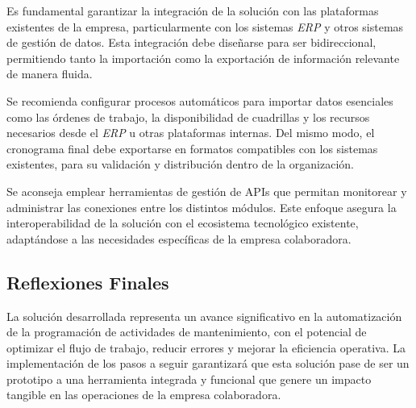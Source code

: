 \documentclass{article}
\begin{document}
Es fundamental garantizar la integración de la solución con las plataformas existentes de la empresa, particularmente con los sistemas \textit{ERP} y otros sistemas de gestión de datos. Esta integración debe diseñarse para ser bidireccional, permitiendo tanto la importación como la exportación de información relevante de manera fluida.

Se recomienda configurar procesos automáticos para importar datos esenciales como las órdenes de trabajo, la disponibilidad de cuadrillas y los recursos necesarios desde el \textit{ERP} u otras plataformas internas. Del mismo modo, el cronograma final debe exportarse en formatos compatibles con los sistemas existentes, para su validación y distribución dentro de la organización.

Se aconseja emplear herramientas de gestión de APIs que permitan monitorear y administrar las conexiones entre los distintos módulos. Este enfoque asegura la interoperabilidad de la solución con el ecosistema tecnológico existente, adaptándose a las necesidades específicas de la empresa colaboradora.


\subsection{Reflexiones Finales}  

La solución desarrollada representa un avance significativo en la automatización de la programación de actividades de mantenimiento, con el potencial de optimizar el flujo de trabajo, reducir errores y mejorar la eficiencia operativa. La implementación de los pasos a seguir garantizará que esta solución pase de ser un prototipo a una herramienta integrada y funcional que genere un impacto tangible en las operaciones de la empresa colaboradora.


\newpage
\end{document}
